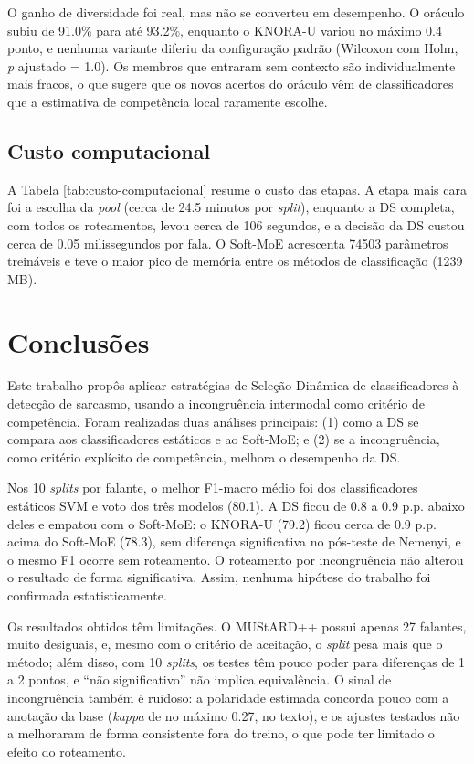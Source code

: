 \documentclass[conference]{IEEEtran}
\begin{document}
O ganho de diversidade foi real, mas não se converteu em desempenho. O oráculo subiu de 91.0\% para até 93.2\%, enquanto o KNORA-U variou no máximo 0.4 ponto, e nenhuma variante diferiu da configuração padrão (Wilcoxon com Holm, \textit{p} ajustado = 1.0). Os membros que entraram sem contexto são individualmente mais fracos, o que sugere que os novos acertos do oráculo vêm de classificadores que a estimativa de competência local raramente escolhe.

\subsection{Custo computacional}

A Tabela \ref{tab:custo-computacional} resume o custo das etapas. A etapa mais cara foi a escolha da \textit{pool} (cerca de 24.5 minutos por \textit{split}), enquanto a DS completa, com todos os roteamentos, levou cerca de 106 segundos, e a decisão da DS custou cerca de 0.05 milissegundos por fala. O Soft-MoE acrescenta 74503 parâmetros treináveis e teve o maior pico de memória entre os métodos de classificação (1239 MB).



\section{Conclusões}
\label{sec:conclusions}

Este trabalho propôs aplicar estratégias de Seleção Dinâmica de classificadores à detecção de sarcasmo, usando a incongruência intermodal como critério de competência. Foram realizadas duas análises principais: (1) como a DS se compara aos classificadores estáticos e ao Soft-MoE; e (2) se a incongruência, como critério explícito de competência, melhora o desempenho da DS.

Nos 10 \textit{splits} por falante, o melhor F1-macro médio foi dos classificadores estáticos SVM e voto dos três modelos (80.1). A DS ficou de 0.8 a 0.9 p.p. abaixo deles e empatou com o Soft-MoE: o KNORA-U (79.2) ficou cerca de 0.9 p.p. acima do Soft-MoE (78.3), sem diferença significativa no pós-teste de Nemenyi, e o mesmo F1 ocorre sem roteamento. O roteamento por incongruência não alterou o resultado de forma significativa. Assim, nenhuma hipótese do trabalho foi confirmada estatisticamente.

Os resultados obtidos têm limitações. O MUStARD++ possui apenas 27 falantes, muito desiguais, e, mesmo com o critério de aceitação, o \textit{split} pesa mais que o método; além disso, com 10 \textit{splits}, os testes têm pouco poder para diferenças de 1 a 2 pontos, e ``não significativo'' não implica equivalência. O sinal de incongruência também é ruidoso: a polaridade estimada concorda pouco com a anotação da base (\textit{kappa} de no máximo 0.27, no texto), e os ajustes testados não a melhoraram de forma consistente fora do treino, o que pode ter limitado o efeito do roteamento.
\end{document}
